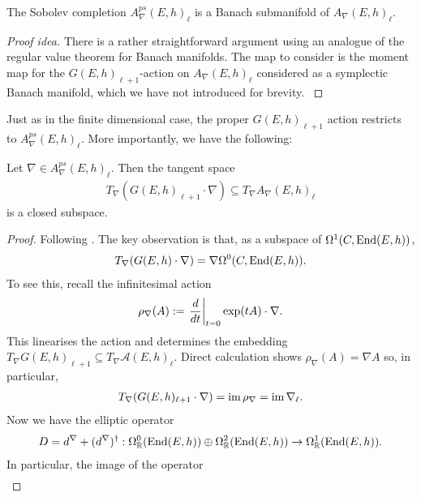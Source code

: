 \documentclass[12pt]{ociamthesis}  %
\begin{document}
\begin{lemma}
  The Sobolev completion $A^{ps}_\nabla(E,h)_\ell$ is a
  Banach submanifold of $A_\nabla(E,h)_\ell$.
  \begin{proof}[Proof idea]
    There is a rather straightforward argument using an analogue
    of the regular value theorem for Banach manifolds. The map
    to consider is the moment map for the $G(E,h)_{\ell+1}$-action
    on $A_\nabla(E,h)_\ell$ considered as a symplectic
    Banach manifold, which we have not introduced for brevity.
    \cite[Proposition 5.8]{neitzke2021}
  \end{proof}
\end{lemma}
Just as in the finite dimensional case, the proper $G(E,h)_{\ell+1}$
action restricts to $A^{ps}_\nabla(E,h)_\ell$.
More importantly, we have the following:
\begin{lemma}\label{lem:holomorphic_tangent_is_closed}
  Let $\nabla\in A^{ps}_\nabla(E,h)_{\ell}$. Then the tangent space
  \begin{align*}
    T_\nabla(G(E,h)_{\ell+1}\cdot\nabla) \subseteq T_\nabla A_\nabla(E,h)_\ell
  \end{align*}
  is a closed subspace.
  \begin{proof}
    Following \cite[77-78]{neitzke2021}.
    The key observation is that, as a subspace of
    $\Omega^1(C,\operatorname{End}(E,h))$,
    \begin{align*}
      T_\nabla (G(E,h)\cdot\nabla) = \nabla\Omega^0(C,\operatorname{End}(E,h)).
    \end{align*}
    To see this, recall the infinitesimal action
    \begin{align*}
      \rho_\nabla(A) := \left.{\frac{d}{dt}}\right\vert_{t=0} \exp(tA)\cdot\nabla.
    \end{align*}
    This linearises the action and determines the embedding
    $T_\nabla G(E,h)_{\ell+1}\subseteq T_\nabla \mathcal A(E,h)_\ell$.
    Direct calculation shows $\rho_\nabla(A) = \nabla A$
    so, in particular,
    \begin{align*}
      T_\nabla(G(E,h)_{\ell+1}\cdot\nabla) = \operatorname{im}\rho_\nabla = \operatorname{im}\nabla_\ell.
    \end{align*}
    Now we have the elliptic operator
    \begin{align*}
      D = d^\nabla + (d^\nabla)^\dagger :
      \Omega^0_{\mathbb R}(\operatorname{End}(E,h)) \oplus
      \Omega^2_{\mathbb R}(\operatorname{End}(E,h)) \to
      \Omega^1_{\mathbb R}(\operatorname{End}(E,h)).
    \end{align*}
    In particular, the image of the operator
    \begin{align*}

\end{align*}
\end{proof}
\end{lemma}
\end{document}
